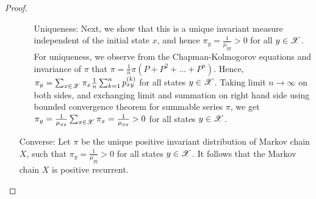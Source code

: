 \documentclass[letterpaper,10pt,english]{article}
\begin{document}
\begin{proof}
\begin{itemize}
\begin{itemize}
\item[Uniqueness:] Next, we show that this is a unique invariant measure independent of the initial state $x$, 
and hence $\pi_y = \frac{1}{\mu_{yy}} > 0$ for all $y \in \sX$.  
For uniqueness, we observe from the Chapman-Kolmogorov equations and invariance of $\pi$ that $\pi = \frac{1}{n}\pi(P + P^2 + \dots + P^n)$.  
Hence, $\pi_y = \sum_{x \in \sX}\pi_x \frac{1}{n}\sum_{k=1}^np_{xy}^{(k)}$ for all states $y \in \sX$.
Taking limit $n \to \infty$ on both sides, and exchanging limit and summation on right hand side using bounded convergence theorem for summable series $\pi$, we get $\pi_y = \frac{1}{\mu_{yy}}\sum_{x \in \sX}\pi_x =  \frac{1}{\mu_{yy}} > 0$ for all states $y \in \sX$.  
\end{itemize}
\item[Converse:]
Let $\pi$ be the unique positive invariant distribution of Markov chain $X$, such that $\pi_y = \frac{1}{\mu_{yy}} > 0$ for all states $y \in \sX$. 
It follows that the Markov chain $X$ is positive recurrent. 
\end{itemize}
\end{proof}
\end{document}
